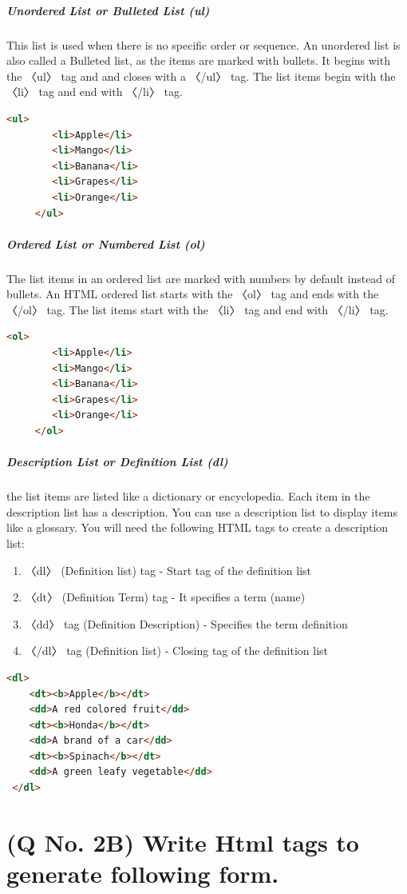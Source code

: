 \documentclass[11pt]{article}
\begin{document}
\subparagraph{Unordered List or Bulleted List (ul)} 
    This list is used when there is no specific order or sequence. An unordered list is also called a Bulleted list, as the items are marked with bullets. It begins with the 〈ul〉 tag and and closes with a 〈/ul〉 tag. The list items begin with the 〈li〉 tag and end with 〈/li〉 tag.
    \begin{lstlisting}[language=html, caption=Unordered list example]
        <ul>
        <li>Apple</li>
        <li>Mango</li>
        <li>Banana</li>
        <li>Grapes</li>
        <li>Orange</li>
     </ul>
    \end{lstlisting}
\subparagraph{Ordered List or Numbered List (ol)}
The list items in an ordered list are marked with numbers by default instead of bullets. An HTML ordered list starts with the 〈ol〉 tag and ends with the 〈/ol〉 tag. The list items start with the 〈li〉 tag and end with 〈/li〉 tag.
    \begin{lstlisting}[language=html, caption=Ordered list example]
        <ol>
        <li>Apple</li>
        <li>Mango</li>
        <li>Banana</li>
        <li>Grapes</li>
        <li>Orange</li>
     </ol>
    \end{lstlisting}
\subparagraph{Description List or Definition List (dl)}
the list items are listed like a dictionary or encyclopedia. Each item in the description list has a description. You can use a description list to display items like a glossary. You will need the following HTML tags to create a description list:
\begin{enumerate}
    \item 〈dl〉 (Definition list) tag - Start tag of the definition list
    \item 〈dt〉 (Definition Term) tag - It specifies a term (name)
    \item 〈dd〉 tag (Definition Description) - Specifies the term definition
    \item 〈/dl〉 tag (Definition list) - Closing tag of the definition list

\end{enumerate}
\begin{lstlisting}[language=html, caption=Description list example]
    <dl>
    <dt><b>Apple</b></dt>
    <dd>A red colored fruit</dd>
    <dt><b>Honda</b></dt>
    <dd>A brand of a car</dd>
    <dt><b>Spinach</b></dt>
    <dd>A green leafy vegetable</dd>
 </dl>
\end{lstlisting}


\section{(Q No. 2B) Write Html tags to generate following form.}

\end{document}
